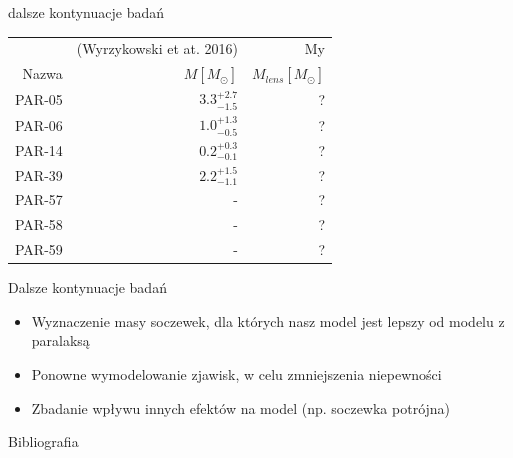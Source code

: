 \documentclass{beamer}
\begin{document}
\begin{frame}{dalsze kontynuacje badań}
    \centering
    \begin{tabular}{rrr}
        \toprule
               & (Wyrzykowski et at. 2016\cite{Basis_paper}) & My                     \\
        Nazwa  & $M [M_{\odot}]$                             & $M_{lens} [M_{\odot}]$ \\
        \midrule
        PAR-05 & $3.3^{+2.7}_{-1.5}$                         & ?                      \\
        PAR-06 & $1.0^{+1.3}_{-0.5}$                         & ?                      \\
        PAR-14 & $0.2^{+0.3}_{-0.1}$                         & ?                      \\
        PAR-39 & $2.2^{+1.5}_{-1.1}$                         & ?                      \\
        PAR-57 & -                                           & ?                      \\
        PAR-58 & -                                           & ?                      \\
        PAR-59 & -                                           & ?                      \\
        \bottomrule
    \end{tabular}

\end{frame}

\begin{frame}{Dalsze kontynuacje badań}
    \begin{itemize}
        \item Wyznaczenie masy soczewek, dla których nasz model jest lepszy od modelu z paralaksą
        \item Ponowne wymodelowanie zjawisk, w celu zmniejszenia niepewności
        \item Zbadanie wpływu innych efektów na model (np. soczewka potrójna)
    \end{itemize}
\end{frame}

\begin{frame}{Bibliografia}

    \printbibliography
    \nocite{*}
\end{frame}
\end{document}
